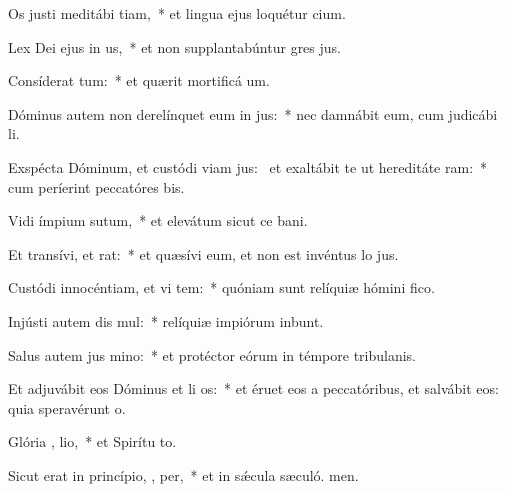\item Os justi meditábi tiam,~* et lingua ejus loquétur cium.
\item Lex Dei ejus in  us,~* et non supplantabúntur gres jus.
\item Consíderat  tum:~* et quærit mortificá um.
\item Dóminus autem non derelínquet eum in  jus:~* nec damnábit eum, cum judicábi li.
\item Exspécta Dóminum, et custódi viam jus:~\pscross{} et exaltábit te ut hereditáte  ram:~* cum períerint peccatóres bis.
\item Vidi ímpium sutum,~* et elevátum sicut ce bani.
\item Et transívi, et   rat:~* et quæsívi eum, et non est invéntus lo jus.
\item Custódi innocéntiam, et vi tem:~* quóniam sunt relíquiæ hómini fico.
\item Injústi autem dis mul:~* relíquiæ impiórum inbunt.
\item Salus autem jus  mino:~* et protéctor eórum in témpore tribulanis.
\item Et adjuvábit eos Dóminus et li os:~* et éruet eos a peccatóribus, et salvábit eos: quia speravérunt  o.
\item Glória ,  lio,~* et Spirítu to.
\item Sicut erat in princípio,  ,  per,~* et in sǽcula sæculó. men.
